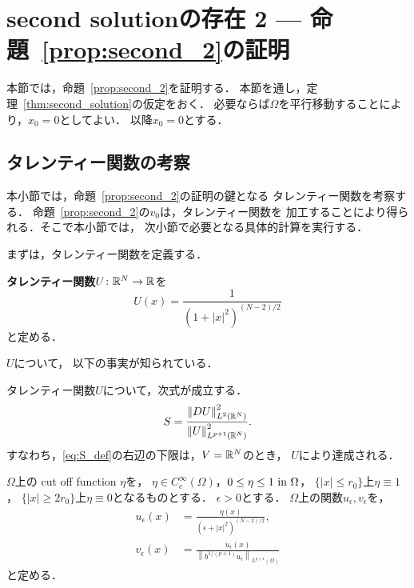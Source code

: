 \section{second solutionの存在 2 --- 命題~\ref{prop:second_2}の証明} \label{sec:second_sol2}

本節では，命題~\ref{prop:second_2}を証明する．
本節を通し，定理~\ref{thm:second_solution}の仮定をおく．
必要ならば$\Omega$を平行移動することにより，$x_0 = 0$としてよい．
以降$x_0 = 0$とする．

\subsection{タレンティー関数の考察}

本小節では，命題~\ref{prop:second_2}の証明の鍵となる
タレンティー関数を考察する．
命題~\ref{prop:second_2}の$v_0$は，タレンティー関数を
加工することにより得られる．そこで本小節では，
次小節で必要となる具体的計算を実行する．

まずは，タレンティー関数を定義する．
\begin{defn}
 {\bf タレンティー関数}$U \colon \mathbb{R}^N \to \mathbb{R}$を
 \[
   U(x) = \frac{1}{(1 + \lvert x \rvert^2)^{(N-2)/2}}
 \]
 と定める．
\end{defn}

$U$について，
以下の事実が知られている．

\begin{lem}[\cite{MR0463908}]
 タレンティー関数$U$について，次式が成立する．
 \begin{equation}
  S = \frac{\left\| DU \right\|_{L^2(\mathbb{R}^N)}^2}
   {\left\| U \right\|_{L^{p+1}(\mathbb{R}^N)}^2}. 
   \label{eq:S_ach}
 \end{equation}
 すなわち，\eqref{eq:S_def}の右辺の下限は，$V = \mathbb{R}^N$のとき，
 $U$により達成される．
\end{lem}

\begin{nota}
$\Omega$上の cut off function $\eta$を，
$\eta \in C^\infty_c (\Omega)$，$0 \leq \eta \leq 1 ~\text{in}~
\Omega$，
$\{ \lvert x \rvert \leq r_0 \}$上$\eta \equiv 1$，
$\{ \lvert x \rvert \geq 2r_0 \}$上$\eta \equiv 0$となるものとする．
$\epsilon > 0$とする．
$\Omega$上の関数$u_\epsilon, v_\epsilon$を，
\begin{align}
 u_\epsilon (x) &= \frac{\eta(x)}{(\epsilon + \lvert x
 \rvert^2)^{(N-2)/2}}, \label{eq:def_uepsilon} \\
 v_\epsilon (x) &= \frac{u_\epsilon(x)}{\left\| b^{1/(p+1)} u_\epsilon \right\|_{L^{p+1}(\Omega)}} \label{eq:def_vepsilon}
\end{align}
と定める．
\end{nota}

